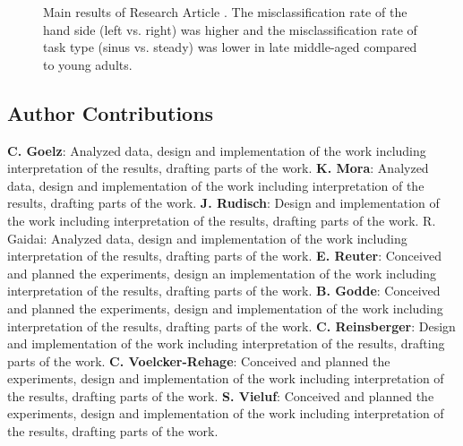 \begin{figure}[h]
\begin{center}

\caption[Main results of Research Article .]{Main results of Research Article . The misclassification rate of the hand side (left vs. right)  was higher and the misclassification rate of task type (sinus vs. steady) was lower in late middle-aged compared to young adults.}
\label{fig:results1}
\end{center}
\end{figure}

\subsection*{Author Contributions}
\textbf{C. Goelz}: Analyzed data, design and implementation of the work including interpretation of the results, drafting parts of the work. \textbf{K. Mora}: Analyzed data, design and implementation of the work including interpretation of the results, drafting parts of the work. \textbf{J. Rudisch}: Design and implementation of the work including interpretation of the results, drafting parts of the work. R. Gaidai: Analyzed data, design and implementation of the work including interpretation of the results, drafting parts of the work. \textbf{E. Reuter}: Conceived and planned the experiments, design an implementation of the work including interpretation of the results, drafting parts of the work. \textbf{B. Godde}: Conceived and planned the experiments, design and implementation of the work including interpretation of the results, drafting parts of the work. \textbf{C. Reinsberger}: Design and implementation of the work including interpretation of the results, drafting parts of the work. \textbf{C. Voelcker-Rehage}: Conceived and planned the experiments, design and implementation of the work including interpretation of the results, drafting parts of the work. \textbf{S. Vieluf}: Conceived and planned the experiments, design and implementation of the work including interpretation of the results, drafting parts of the work.
